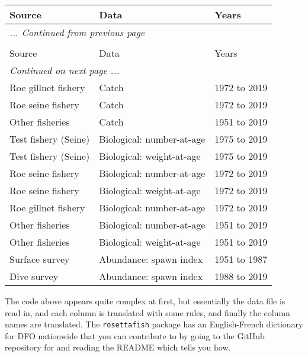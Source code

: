 \documentclass[12pt]{article}\usepackage[]{graphicx}\usepackage[]{color}
\begin{document}
\begin{longtable}[t]{lll} \caption{\label{tab:herring}}\\ \toprule Source & Data & Years\\ \midrule \endfirsthead \multicolumn{3}{l}{\textit{... Continued from previous page}} \\ \hline \caption*{}\\ \toprule Source & Data & Years\\ \midrule \endhead \hline \multicolumn{3}{l}{\textit{Continued on next page ...}} \\ \endfoot \bottomrule \endlastfoot Roe gillnet fishery & Catch & 1972 to 2019\\ Roe seine fishery & Catch & 1972 to 2019\\ Other fisheries & Catch & 1951 to 2019\\ Test fishery (Seine) & Biological: number-at-age & 1975 to 2019\\ Test fishery (Seine) & Biological: weight-at-age & 1975 to 2019\\ Roe seine fishery & Biological: number-at-age & 1972 to 2019\\ Roe seine fishery & Biological: weight-at-age & 1972 to 2019\\ Roe gillnet fishery & Biological: number-at-age & 1972 to 2019\\ Other fisheries & Biological: number-at-age & 1951 to 2019\\ Other fisheries & Biological: weight-at-age & 1951 to 2019\\ Surface survey & Abundance: spawn index & 1951 to 1987\\ Dive survey & Abundance: spawn index & 1988 to 2019\\* \end{longtable}

The code above appears quite complex at first, but essentially the data file is read in, and each column is translated with some rules, and finally the column names are translated. The \texttt{rosettafish} package has an English-French dictionary for DFO nationwide that you can contribute to by going to the GitHub repository for  and reading the README which tells you how.
\end{document}
